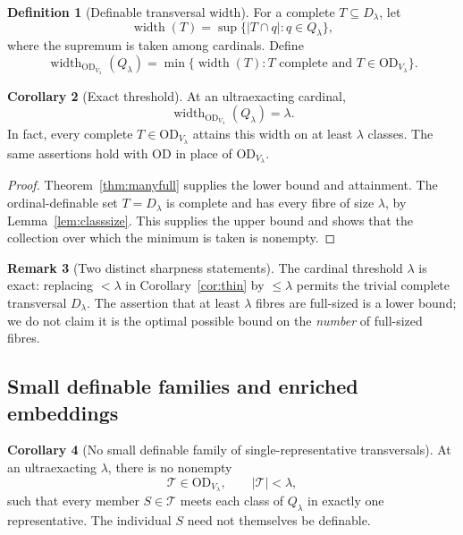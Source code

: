 \documentclass[11pt,letterpaper]{article}
\theoremstyle{definition}
\newtheorem{definition}{Definition}[section]
\newtheorem{corollary}[definition]{Corollary}
\newtheorem{remark}[definition]{Remark}
\numberwithin{equation}{section}
\newcommand{\OD}{\mathrm{OD}}
\newcommand{\width}{\operatorname{width}}
\begin{document}
\begin{definition}[Definable transversal width]
For a complete $T\subseteq D_\lambda$, let
\[
 \width(T)=\sup\{|T\cap q|:q\in Q_\lambda\},
\]
where the supremum is taken among cardinals. Define
\[
 \width_{\OD_{V_\lambda}}(Q_\lambda)
   =\min\{\width(T):T\text{ complete and }T\in\OD_{V_\lambda}\}.
\]
\end{definition}

\begin{corollary}[Exact threshold]\label{cor:width}
At an ultraexacting cardinal,
\[
 \width_{\OD_{V_\lambda}}(Q_\lambda)=\lambda.
\]
In fact, every complete $T\in\OD_{V_\lambda}$ attains this width on at least $\lambda$ classes. The same assertions hold with $\OD$ in place of $\OD_{V_\lambda}$.
\end{corollary}

\begin{proof}
Theorem~\ref{thm:manyfull} supplies the lower bound and attainment. The ordinal-definable set $T=D_\lambda$ is complete and has every fibre of size $\lambda$, by Lemma~\ref{lem:classsize}. This supplies the upper bound and shows that the collection over which the minimum is taken is nonempty.
\end{proof}

\begin{remark}[Two distinct sharpness statements]
The cardinal threshold $\lambda$ is exact: replacing $<\lambda$ in Corollary~\ref{cor:thin} by $\le\lambda$ permits the trivial complete transversal $D_\lambda$. The assertion that at least $\lambda$ fibres are full-sized is a lower bound; we do not claim it is the optimal possible bound on the \emph{number} of full-sized fibres.
\end{remark}

\subsection{Small definable families and enriched embeddings}

\begin{corollary}[No small definable family of single-representative transversals]\label{cor:family}
At an ultraexacting $\lambda$, there is no nonempty
\[
 \mathscr T\in\OD_{V_\lambda},\qquad |\mathscr T|<\lambda,
\]
such that every member $S\in\mathscr T$ meets each class of $Q_\lambda$ in exactly one representative. The individual $S$ need not themselves be definable.
\end{corollary}
\end{document}
